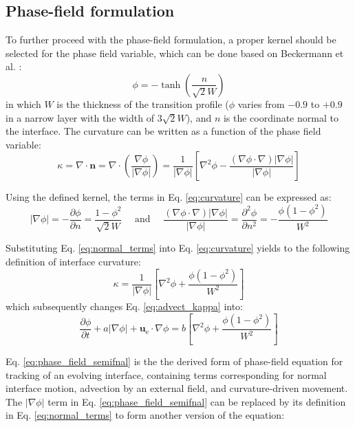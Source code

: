 \subsection{Phase-field formulation}

To further proceed with the phase-field formulation, a proper kernel should be selected for the phase field variable, which can be done based on Beckermann et al. \cite{Beckermann1999}:
\begin{equation} \label{eq:kernel}
\phi=-\tanh \left(\frac{n}{\sqrt{2} W}\right)
\end{equation}
in which $W$ is the thickness of the transition profile ($\phi$ varies from $-0.9$ to $+0.9$ in a narrow layer with the width of $3 \sqrt{2} W$), and $n$ is the coordinate normal to the interface. The curvature can be written as a function of the phase field variable:
\begin{equation}  \label{eq:curvature}
\kappa=\nabla \cdot \boldsymbol{n}=\nabla \cdot\left(\frac{\nabla \phi}{|\nabla \phi|}\right)=\frac{1}{|\nabla \phi|}\left[\nabla^{2} \phi-\frac{(\nabla \phi \cdot \nabla)|\nabla \phi|}{|\nabla \phi|}\right]
\end{equation}

Using the defined kernel, the terms in Eq. \ref{eq:curvature} can be expressed as:
\begin{equation} \label{eq:normal_terms}
|\nabla \phi|=-\frac{\partial \phi}{\partial n}=\frac{1-\phi^{2}}{\sqrt{2} W} \quad \text { and } \quad \frac{(\nabla \phi \cdot \nabla)|\nabla \phi|}{|\nabla \phi|}=\frac{\partial^{2} \phi}{\partial n^{2}}=-\frac{\phi\left(1-\phi^{2}\right)}{W^{2}}
\end{equation}

Substituting Eq. \ref{eq:normal_terms} into Eq. \ref{eq:curvature} yields to the following definition of interface curvature: 
\begin{equation}
\kappa=\frac{1}{|\nabla \phi|}\left[\nabla^{2} \phi+\frac{\phi\left(1-\phi^{2}\right)}{W^{2}}\right]
\end{equation}
which subsequently changes Eq. \ref{eq:advect_kappa} into:
\begin{equation} \label{eq:phase_field_semifnal}
\frac{\partial \phi}{\partial t}+a|\nabla \phi|+\boldsymbol{u}_{\mathrm{e}} \cdot \nabla \phi=b\left[\nabla^{2} \phi+\frac{\phi\left(1-\phi^{2}\right)}{W^{2}}\right]
\end{equation}

Eq. \ref{eq:phase_field_semifnal} is the the derived form of phase-field equation for tracking of an evolving interface, containing terms corresponding for normal interface motion, advection by an external field, and curvature-driven movement. The $|\nabla \phi|$ term in Eq. \ref{eq:phase_field_semifnal} can be replaced by its definition in Eq. \ref{eq:normal_terms} to form another version of the equation:


